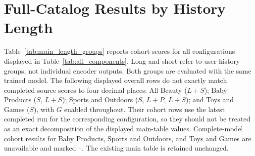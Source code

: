 \documentclass[11pt]{article}
\begin{document}
\section{Full-Catalog Results by History Length}
\label{app:full_catalog_groups}
Table~\ref{tab:main_length_groups} reports cohort scores for all configurations displayed in Table~\ref{tab:all_components}. Long and short refer to user-history groups, not individual encoder outputs. Both groups are evaluated with the same trained model.
The following displayed overall rows do not exactly match completed source scores to four decimal places: All Beauty ($L+S$); Baby Products ($S$, $L+S$); Sports and Outdoors ($S$, $L+P$, $L+S$); and Toys and Games ($S$), with $G$ enabled throughout. Their cohort rows use the latest completed run for the corresponding configuration, so they should not be treated as an exact decomposition of the displayed main-table values. Complete-model cohort results for Baby Products, Sports and Outdoors, and Toys and Games are unavailable and marked --. The existing main table is retained unchanged.
\end{document}
